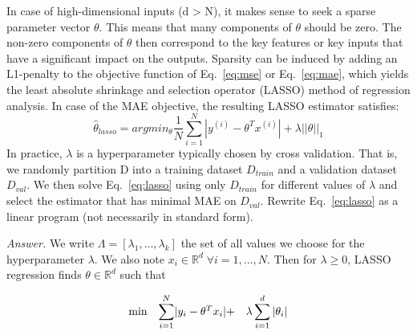 \documentclass[10pt]{article}
\newenvironment{exercise}[2][Exercise]{\begin{trivlist}
  \item[\hskip \labelsep {\bfseries #1}\hskip \labelsep {\bfseries #2.}]}{\end{trivlist}}
\begin{document}
\begin{exercise}{2}
In case of high-dimensional inputs (d > N), it makes sense to seek a sparse
parameter vector $\theta$. This means that many components of $\theta$ should be zero. The non-zero components of $\theta$ then correspond to the key features or key inputs that have a significant impact on the outputs. Sparsity can be induced by adding an L1-penalty to the objective function of Eq.~\ref{eq:mse} or Eq.~\ref{eq:mae}, which yields the least absolute
shrinkage and selection operator (LASSO) method of regression analysis. In case of the MAE objective, the resulting LASSO estimator satisfies:
\begin{equation}\label{eq:lasso}
    \hat\theta_{lasso} = arg min_\theta  \frac{1}{N} \sum_{i=1}^N|y^{(i)}-\theta^Tx^{(i)}| + \lambda ||\theta||_1 
\end{equation}
In practice, $\lambda$ is a hyperparameter typically chosen by cross validation. That is, we randomly partition D into a training dataset $D_{train}$
and a validation dataset $D_{val}$. We then solve Eq.~\ref{eq:lasso} using only $D_{train}$ for different
values of $\lambda$ and select the estimator that has minimal MAE on $D_{val}$. Rewrite Eq.~\ref{eq:lasso} as a linear program (not necessarily in standard form).

\textit{Answer.} 
We write $\Lambda = [\lambda_1, ... , \lambda_k]$ the set of all values we choose for the hyperparameter $\lambda$. We also note $x_i\in \mathbb{R}^d \; \forall i=1 ,\dots, N$. Then for $\lambda\geq 0$, LASSO regression finds $\theta \in \mathbb{R}^d$ such that   

\begin{equation}
\begin{array}{ll@{}lll}
\text{min} &\displaystyle\sum\limits_{i=1}^{N} & |y_i-\theta^Tx_i| + &\lambda\displaystyle\sum\limits_{i=1}^{d}|\theta_i|
\end{array}
\end{equation}


\end{exercise}
\end{document}
